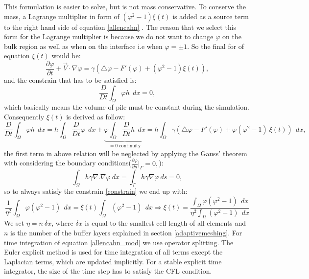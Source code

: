 \documentclass[letterpaper,10pt]{article}
\begin{document}
This formulation is easier to solve, but is not mass conservative. To conserve the mass, a Lagrange multiplier in form of $(\varphi^2-1)\xi(t)$ is added as a source term to the right hand side of equation \eqref{allencahn} \cite{Kim2014,Yang2006}. The reason that we select this form for the Lagrange multiplier is because we do not want to change $\varphi$ on the bulk region as well as when on the interface i.e when $\varphi=\pm1$. So the final for of equation $\xi(t)$ would be:  
\begin{equation} 
        \label{allencahn_mod}
        \frac{\partial \varphi }{\partial t} + \overrightarrow{V}\cdot \nabla \varphi = 
        \gamma (\bigtriangleup\varphi -F'(\varphi)+ (\varphi^2-1)\xi(t)),
\end{equation}
and the constrain that has to be satisfied is:
\begin{equation} 
        \label{constrain}
        \frac{D}{Dt} \int_\Omega \varphi h \ \ dx= 0,
\end{equation}
which basically means the volume of pile must be constant during the simulation. Consequently $\xi(t)$ is derived as follow:
\begin{equation} 
        \label{eta}
        \frac{D}{Dt} \int_\Omega \varphi h \ \ dx= h \int_\Omega \frac{D}{Dt}  \varphi  \ \ dx+\underbrace{\varphi \int_\Omega  \frac{D}{Dt} h  \ \ dx}_{=0 \text{\ \ continuity}}=h\int_\Omega \gamma (\bigtriangleup\varphi -F'(\varphi)+\varphi (\varphi^2-1)\ \xi(t)) \ \ dx,
\end{equation}
the first term in above relation will be neglected by applying the Gauss' theorem with considering the boundary conditions($
        \frac{\partial \varphi}{\partial n}\vert_{\Gamma} = 0,
$):
\begin{equation}
        \label{lapbound}
        \int_\Omega h \gamma  \nabla. \nabla \varphi \ dx = 
        \int_\Gamma h \gamma \nabla \varphi \ ds = 0,
\end{equation}
so to always satisfy the constrain \eqref{constrain} we end up with:
\begin{equation} 
        \label{eta_cont}
\frac{1}{\eta^2} \int_\Omega  \varphi (\varphi^2 -1) \ \ dx = \xi(t) \int_\Omega (\varphi^2-1)  \ \ dx \Rightarrow \xi(t) = \frac{\int_\Omega  \varphi (\varphi^2 -1) \ \ dx}{\eta^2 \int_\Omega (\varphi^2-1)  \ \ dx }
\end{equation}
We set $\eta=n\  \delta x$, where $\delta x$ is equal to the smallest cell length of all elements and $n$ is the number of the buffer layers explained in section \ref{adaptivemeshing}.
For time integration of equation \eqref{allencahn_mod} we use operator splitting. The Euler explicit method is used for time integration of all terms except the Laplacian terms, 
which are updated implicitly. For a stable explicit time integrator, the size of the time step has to satisfy the CFL condition.
\end{document}
